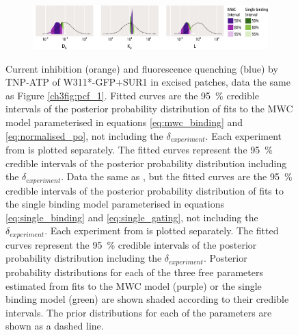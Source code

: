 \begin{figure}[h]
\begin{subfigure}[t]{0.45\textwidth}
	\end{subfigure}
	\vfill
	\begin{subfigure}[t]{0.9\textwidth}
		\caption{}\label{ch4fig:w311_mwc_fit_3}
		\centering
		\includegraphics[width=\textwidth]{w311_mwc_fit_3.pdf}
	\end{subfigure}
	\caption[A concerted model explains the data better than an independent model]{
	 Current inhibition (orange) and fluorescence quenching (blue) by TNP-ATP of W311*-GFP+SUR1 in excised patches, data the same as Figure \ref{ch3fig:pcf_1}.
	Fitted curves are the \SI{95}{\percent} credible intervals of the posterior probability distribution of fits to the MWC model parameterised in equations \ref{eq:mwc_binding} and \ref{eq:normalised_po}, not including the $\delta_{experiment}$.
	 Each experiment from  is plotted separately.
	The fitted curves represent the \SI{95}{\percent} credible intervals of the posterior probability distribution including the $\delta_{experiment}$.
	 Data the same as , but the fitted curves are the \SI{95}{\percent} credible intervals of the posterior probability distribution of fits to the single binding model parameterised in equations \ref{eq:single_binding} and \ref{eq:single_gating}, not including the $\delta_{experiment}$.
	 Each experiment from  is plotted separately.
	The fitted curves represent the \SI{95}{\percent} credible intervals of the posterior probability distribution including the $\delta_{experiment}$.
	 Posterior probability distributions for each of the three free parameters estimated from fits to the MWC model (purple) or the single binding model (green) are shown shaded according to their credible intervals.
	The prior distributions for each of the parameters are shown as a dashed line.
	}\label{ch4fig:w311_model_comparison}
\end{figure}

